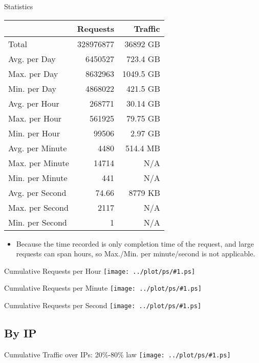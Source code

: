 \documentclass{beamer}
\newcommand\graph[1]{{\texttt{[image: ../plot/ps/\#1.ps]}}}
\begin{document}
\begin{frame}{Statistics}
\begin{tabular}[t]{|l|r|r|}
\hline
 & Requests & Traffic \\
\hline
Total & 328976877 & 36892 GB \\
Avg. per Day & 6450527 & 723.4 GB \\
Max. per Day & 8632963 & 1049.5 GB \\
Min. per Day & 4868022 & 421.5 GB \\
Avg. per Hour & 268771 & 30.14 GB \\
Max. per Hour & 561925 & 79.75 GB \\
Min. per Hour & 99506 & 2.97 GB \\
Avg. per Minute & 4480 & 514.4 MB \\
Max. per Minute & 14714 & N/A \\
Min. per Minute & 441 & N/A \\
Avg. per Second & 74.66 & 8779 KB \\
Max. per Second & 2117 & N/A \\
Min. per Second & 1 & N/A \\
\hline
\end{tabular}
\begin{itemize}
  \item \tiny{Because the time recorded is only completion time of the request, and large requests can span hours, so Max./Min. per minute/second is not applicable.}
\end{itemize}
\end{frame}

\begin{frame}{Cumulative Requests per Hour}
\graph{req-acc-hour}
\end{frame}

\begin{frame}{Cumulative Requests per Minute}
\graph{req-acc-min}
\end{frame}

\begin{frame}{Cumulative Requests per Second}
\graph{req-acc-sec}
\end{frame}


\subsection{By IP}

\begin{frame}{Cumulative Traffic over IPs: 20\%-80\% law}
\graph{traffic-acc-ip}
\end{frame}
\end{document}
